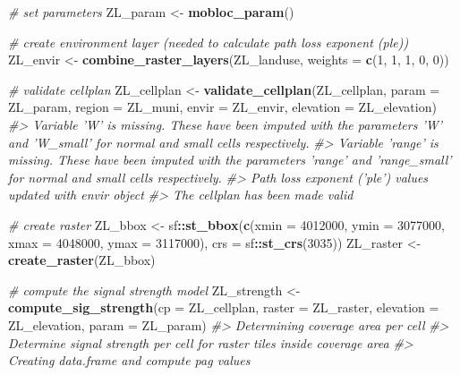 \documentclass[
]{article}
\newenvironment{Shaded}{\begin{snugshade}}{\end{snugshade}}
\newcommand{\CommentTok}[1]{\textcolor[rgb]{0.56,0.35,0.01}{\textit{#1}}}
\newcommand{\DataTypeTok}[1]{\textcolor[rgb]{0.13,0.29,0.53}{#1}}
\newcommand{\DecValTok}[1]{\textcolor[rgb]{0.00,0.00,0.81}{#1}}
\newcommand{\KeywordTok}[1]{\textcolor[rgb]{0.13,0.29,0.53}{\textbf{#1}}}
\newcommand{\NormalTok}[1]{#1}
\newcommand{\OperatorTok}[1]{\textcolor[rgb]{0.81,0.36,0.00}{\textbf{#1}}}
\newcommand{\StringTok}[1]{\textcolor[rgb]{0.31,0.60,0.02}{#1}}
\begin{document}
\begin{Shaded}
\begin{Highlighting}[]
\CommentTok{# set parameters}
\NormalTok{ZL_param <-}\StringTok{ }\KeywordTok{mobloc_param}\NormalTok{()}

\CommentTok{# create environment layer (needed to calculate path loss exponent (ple))}
\NormalTok{ZL_envir <-}\StringTok{ }\KeywordTok{combine_raster_layers}\NormalTok{(ZL_landuse, }\DataTypeTok{weights =} \KeywordTok{c}\NormalTok{(}\DecValTok{1}\NormalTok{, }\DecValTok{1}\NormalTok{, }\DecValTok{1}\NormalTok{, }\DecValTok{0}\NormalTok{, }\DecValTok{0}\NormalTok{))}

\CommentTok{# validate cellplan}
\NormalTok{ZL_cellplan <-}\StringTok{ }\KeywordTok{validate_cellplan}\NormalTok{(ZL_cellplan, }\DataTypeTok{param =}\NormalTok{ ZL_param, }\DataTypeTok{region =}\NormalTok{ ZL_muni,}
    \DataTypeTok{envir =}\NormalTok{ ZL_envir, }\DataTypeTok{elevation =}\NormalTok{ ZL_elevation)}
\CommentTok{#> Variable 'W' is missing. These have been imputed with the parameters 'W' and 'W_small' for normal and small cells respectively.}
\CommentTok{#> Variable 'range' is missing. These have been imputed with the parameters 'range' and 'range_small' for normal and small cells respectively.}
\CommentTok{#> Path loss exponent ('ple') values updated with envir object}
\CommentTok{#> The cellplan has been made valid}

\CommentTok{# create raster}
\NormalTok{ZL_bbox <-}\StringTok{ }\NormalTok{sf}\OperatorTok{::}\KeywordTok{st_bbox}\NormalTok{(}\KeywordTok{c}\NormalTok{(}\DataTypeTok{xmin =} \DecValTok{4012000}\NormalTok{, }\DataTypeTok{ymin =} \DecValTok{3077000}\NormalTok{, }\DataTypeTok{xmax =} \DecValTok{4048000}\NormalTok{, }\DataTypeTok{ymax =} \DecValTok{3117000}\NormalTok{),}
    \DataTypeTok{crs =}\NormalTok{ sf}\OperatorTok{::}\KeywordTok{st_crs}\NormalTok{(}\DecValTok{3035}\NormalTok{))}
\NormalTok{ZL_raster <-}\StringTok{ }\KeywordTok{create_raster}\NormalTok{(ZL_bbox)}

\CommentTok{# compute the signal strength model}
\NormalTok{ZL_strength <-}\StringTok{ }\KeywordTok{compute_sig_strength}\NormalTok{(}\DataTypeTok{cp =}\NormalTok{ ZL_cellplan, }\DataTypeTok{raster =}\NormalTok{ ZL_raster,}
    \DataTypeTok{elevation =}\NormalTok{ ZL_elevation, }\DataTypeTok{param =}\NormalTok{ ZL_param)}
\CommentTok{#> Determining coverage area per cell}
\CommentTok{#> Determine signal strength per cell for raster tiles inside coverage area}
\CommentTok{#> Creating data.frame and compute pag values}


\end{Highlighting}
\end{Shaded}
\end{document}
